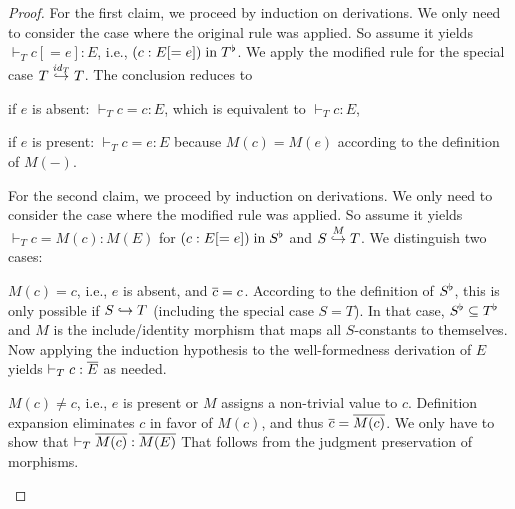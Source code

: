 \begin{proof}
For the first claim, we proceed by induction on derivations.
We only need to consider the case where the original rule was applied.
So assume it yields $\vdash_T c[=e]:E$, i.e., $(c:E[=e]) \minn \flt{T}$.
We apply the modified rule for the special case $\ipc{\id{T}}{T}{T}$.
The conclusion reduces to
\begin{compactitem}
 \item if $e$ is absent: $\vdash_T c=c:E$, which is equivalent to $\vdash_T c:E$,
 \item if $e$ is present: $\vdash_T c=e:E$ because $M(c)=M(e)$ according to the definition of $M(-)$.
\end{compactitem}

For the second claim, we proceed by induction on derivations.
We only need to consider the case where the modified rule was applied.
So assume it yields $\vdash_T c=M(c):M(E)$ for $(c:E[=e]) \minn \flt{S}$ and $\ipc{M}{S}{T}$.
We distinguish two cases:
\begin{compactitem}
 \item $M(c)=c$, i.e., $e$ is absent, and $\ov{c}=c$.
   According to the definition of $\flt{S}$, this is only possible if $S\harr T$ (including the special case $S=T$).
   In that case, $\flt{S}\sq\flt{T}$ and $M$ is the include/identity morphism that maps all $S$-constants to themselves.
   Now applying the induction hypothesis to the well-formedness derivation of $E$ yields $\vdash_T c:\ov{E}$ as needed.
 \item $M(c)\neq c$, i.e., $e$ is present or $M$ assigns a non-trivial value to $c$.
  Definition expansion eliminates $c$ in favor of $M(c)$, and thus $\ov{c}=\ov{M(c)}$.
  We only have to show that $\vdash_T \ov{M(c)}:\ov{M(E)}$ That follows from the judgment preservation of morphisms.
\end{compactitem}
\end{proof}

